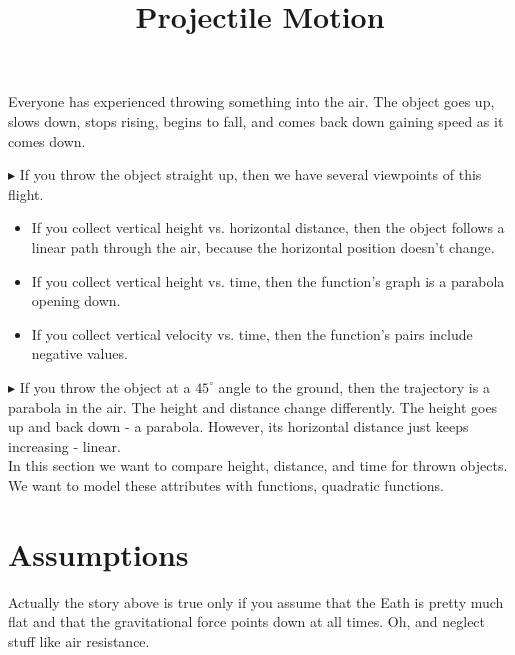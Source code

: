 \documentclass{ximera}
\title{Projectile Motion}
\begin{document}
\begin{abstract}
\end{abstract}
\maketitle



Everyone has experienced throwing something into the air. The object goes up, slows down, stops rising, begins to fall, and comes back down gaining speed as it comes down.  





$\blacktriangleright$ If you throw the object straight up, then we have several viewpoints of this flight. 

\begin{itemize}
\item If you collect vertical height vs. horizontal distance, then the object follows a linear path through the air, because the horizontal position doesn't change.  
\item If you collect vertical height vs. time, then the function's graph is a parabola opening down.
\item If you collect vertical velocity vs. time, then the function's pairs include negative values.
\end{itemize}




$\blacktriangleright$  If you throw the object at a $45^{\circ}$ angle to the ground, then the trajectory is a parabola in the air.  The height and distance change differently.  The height goes up and back down - a parabola.  However, its horizontal distance just keeps increasing - linear. \\


In this section we want to compare height, distance, and time for thrown objects. \\

We want to model these attributes with functions, quadratic functions.



\section{Assumptions}

Actually the story above is true only if you assume that the Eath is pretty much flat and that the gravitational force points down at all times. Oh, and neglect stuff like air resistance.
\end{document}
